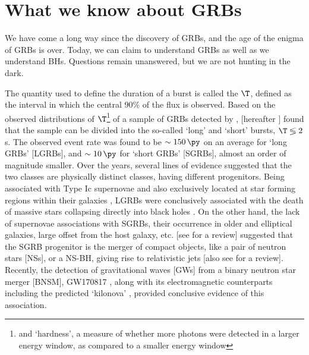 \section{What we know about GRBs}
\label{sec:what_we_know}
We have come a long way since the discovery of GRBs, and the age of the enigma of GRBs is over. Today, we can claim to understand GRBs as well as we understand BHs. Questions remain unanswered, but we are not hunting in the dark.

The quantity used to define the duration of a burst is called the $\T$, defined as the interval in which the central $90 \%$ of the flux is observed. Based on the observed distributions of $\T$\footnote{and `hardness', a measure of whether more photons were detected in a larger energy window, as compared to a smaller energy window} of a sample of GRBs detected by \B, \cite{Kouveliotou_et_al.-1993-ApJ} [hereafter ] found that the sample can be divided into the so-called `long' and `short' bursts, $\T \lessgtr 2$ s. The observed event rate was found to be $\sim 150 \, \py$ on an average for `long GRBs' [LGRBs], and $\sim 10 \, \py$ for `short GRBs' [SGRBs], almost an order of magnitude smaller. Over the years, several lines of evidence suggested that the two classes are physically distinct classes, having different progenitors. Being associated with Type Ic supernovae \citep{Woosley_and_Bloom-2006-ARA&A} and also exclusively located at star forming regions within their galaxies \citep{Wainwright_et_al.-2007-ApJ, Fruchter_et_al.-2006-Nature}, LGRBs were conclusively associated with the death of massive stars collapsing directly into black holes \citep{MacFayden_and_Woosley-1999-ApJ, Woosley_and_MacFayden-1999-A&AS}. On the other hand, the lack of supernovae associations with SGRBs, their occurrence in older and elliptical galaxies, large offset from the host galaxy, etc. [see \cite{Berger-2014-sGRB_review} for a review] suggested that the SGRB progenitor is the merger of compact objects, like a pair of neutron stars [NSs], or a NS-BH, giving rise to relativistic jets \citep{Eichler_et_al.-1989-Nature, Narayan_et_al.-1992-ApJ} [also see \cite{Nakar-2007-PhR} for a review]. Recently, the detection of gravitational waves [GWs] from a binary neutron star merger [BNSM], GW170817 \citep{GW170817-2017}, along with its electromagnetic counterparts including the predicted `kilonova' \citep{EM170817-2017}, provided conclusive evidence of this association.

